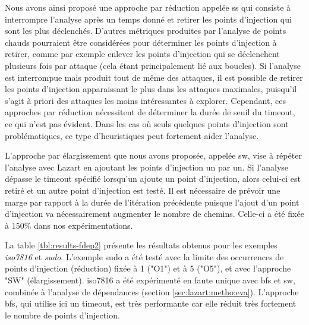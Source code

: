                 Nous avons ainsi proposé une approche par réduction appelée \gls{ss} qui consiste à
                interrompre l'analyse après un temps donné et retirer les points d'injection qui sont les plus déclenchés.
                D'autres métriques produites par l'analyse de points chauds pourraient être considérées pour déterminer les points d'injection à retirer, comme par exemple enlever les points d'injection qui se déclenchent plusieurs fois par attaque (cela étant principalement lié aux boucles).
                Si l'analyse est interrompue mais produit tout de même des attaques, il est possible de retirer les points d'injection apparaissant le plus dans les attaques maximales, puisqu'il s'agit à priori des attaques les moins intéressantes à explorer. 
                Cependant, ces approches par réduction nécessitent de déterminer la durée de seuil du timeout, ce qui n'est pas évident. 
                Dans les cas où seuls quelques points d'injection sont problématiques, ce type d'heuristiques peut fortement aider l'analyse.
                
                L'approche par élargissement que nous avons proposée, appelée \gls{sw}, vise à répéter l'analyse avec Lazart en ajoutant les points d'injection un par un. Si l'analyse dépasse le timeout spécifié lorsqu'un ajoute un point d'injection, alors celui-ci est retiré et un autre point d'injection est testé.
                Il est nécessaire de prévoir une marge par rapport à la durée de l'itération précédente puisque l'ajout d'un point d'injection va nécessairement augmenter le nombre de chemins. Celle-ci a été fixée à 150\% dans nos expérimentations. 
                
                La table \ref{tbl:results-fdep2} présente les résultats obtenus pour les exemples \textit{iso7816} et \textit{sudo}.
                L'exemple sudo a été testé avec la limite des occurrences de points d'injection (réduction) fixée à 1 ("O1") et à 5 ("O5"), et avec l'approche "SW" (élargissement).
                iso7816 a été expérimenté en faute unique avec \gls{bfs} et \gls{sw}, combinée à l'analyse de dépendances (section \ref{sec:lazart:metho:eva}).
                L'approche \gls{bfs}, qui utilise ici un timeout, est très performante car elle réduit très fortement le nombre de points d'injection.
                
